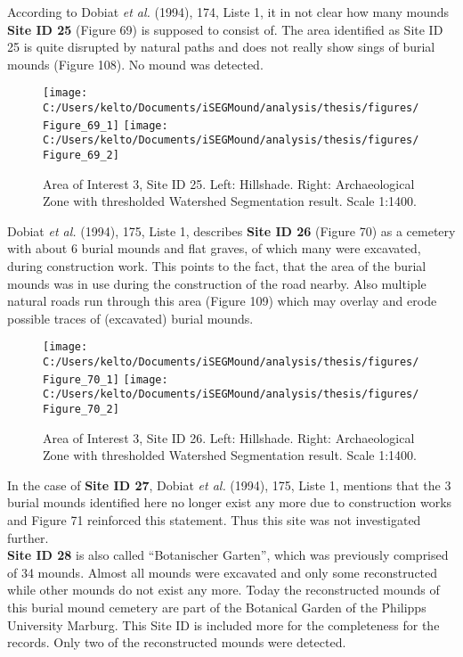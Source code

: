 \documentclass[
  12pt,
]{article}
\begin{document}
According to Dobiat \emph{et al.} (1994), 174, Liste 1, it in not clear how many mounds \textbf{Site ID 25} (Figure 69) is supposed to consist of.
The area identified as Site ID 25 is quite disrupted by natural paths and does not really show sings of burial mounds (Figure 108). No mound was detected.

\begin{figure}
\texttt{[image: C:/Users/kelto/Documents/iSEGMound/analysis/thesis/figures/Figure\_69\_1]} \texttt{[image: C:/Users/kelto/Documents/iSEGMound/analysis/thesis/figures/Figure\_69\_2]} \caption{Area of Interest 3, Site ID 25. Left: Hillshade. Right: Archaeological Zone with thresholded Watershed Segmentation result. Scale 1:1400.}\label{fig:Figure69}
\end{figure}

Dobiat \emph{et al.} (1994), 175, Liste 1, describes \textbf{Site ID 26} (Figure 70) as a cemetery with about 6 burial mounds and flat graves, of which many were excavated, during construction work. This points to the fact, that the area of the burial mounds was in use during the construction of the road nearby. Also multiple natural roads run through this area (Figure 109) which may overlay and erode possible traces of (excavated) burial mounds.

\begin{figure}
\texttt{[image: C:/Users/kelto/Documents/iSEGMound/analysis/thesis/figures/Figure\_70\_1]} \texttt{[image: C:/Users/kelto/Documents/iSEGMound/analysis/thesis/figures/Figure\_70\_2]} \caption{Area of Interest 3, Site ID 26. Left: Hillshade. Right: Archaeological Zone with thresholded Watershed Segmentation result. Scale 1:1400.}\label{fig:Figure70}
\end{figure}

In the case of \textbf{Site ID 27}, Dobiat \emph{et al.} (1994), 175, Liste 1, mentions that the 3 burial mounds identified here no longer exist any more due to construction works and Figure 71 reinforced this statement. Thus this site was not investigated further.\\
\textbf{Site ID 28} is also called ``Botanischer Garten'', which was previously comprised of 34 mounds. Almost all mounds were excavated and only some reconstructed while other mounds do not exist any more. Today the reconstructed mounds of this burial mound cemetery are part of the Botanical Garden of the Philipps University Marburg. This Site ID is included more for the completeness for the records. Only two of the reconstructed mounds were detected.
\end{document}
